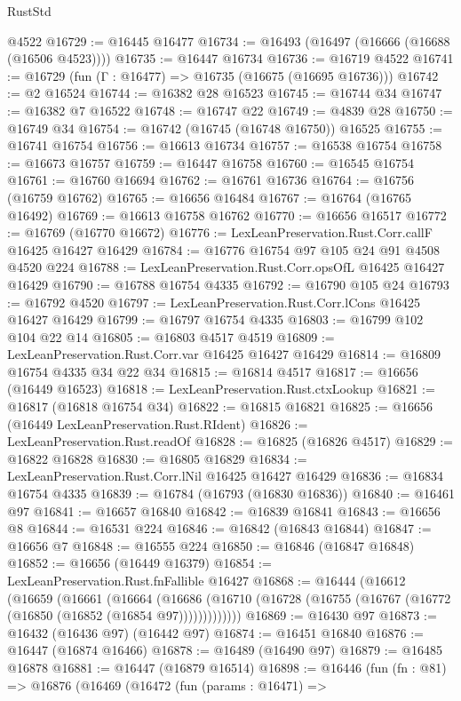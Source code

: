 \begin{lexlean}{RustStd}
\begin{coremodule}
    @4522
@16729 := @16445 @16477
@16734 := @16493 (@16497 (@16666 (@16688 (@16506 @4523))))
@16735 := @16447 @16734
@16736 := @16719 @4522
@16741 := @16729 (fun (Γ : @16477) => @16735 (@16675 (@16695 @16736)))
@16742 := @2 @16524
@16744 := @16382 @28 @16523
@16745 := @16744 @34
@16747 := @16382 @7 @16522
@16748 := @16747 @22
@16749 := @4839 @28
@16750 := @16749 @34
@16754 := @16742 (@16745 (@16748 @16750)) @16525
@16755 := @16741 @16754
@16756 := @16613 @16734
@16757 := @16538 @16754
@16758 := @16673 @16757
@16759 := @16447 @16758
@16760 := @16545 @16754
@16761 := @16760 @16694
@16762 := @16761 @16736
@16764 := @16756 (@16759 @16762)
@16765 := @16656 @16484
@16767 := @16764 (@16765 @16492)
@16769 := @16613 @16758 @16762
@16770 := @16656 @16517
@16772 := @16769 (@16770 @16672)
@16776 := LexLeanPreservation.Rust.Corr.callF @16425 @16427 @16429
@16784 := @16776 @16754 @97 @105 @24 @91 @4508 @4520 @224
@16788 := LexLeanPreservation.Rust.Corr.opsOfL @16425 @16427 @16429
@16790 := @16788 @16754 @4335
@16792 := @16790 @105 @24
@16793 := @16792 @4520
@16797 := LexLeanPreservation.Rust.Corr.lCons @16425 @16427 @16429
@16799 := @16797 @16754 @4335
@16803 := @16799 @102 @104 @22 @14
@16805 := @16803 @4517 @4519
@16809 := LexLeanPreservation.Rust.Corr.var @16425 @16427 @16429
@16814 := @16809 @16754 @4335 @34 @22 @34
@16815 := @16814 @4517
@16817 := @16656 (@16449 @16523)
@16818 := LexLeanPreservation.Rust.ctxLookup
@16821 := @16817 (@16818 @16754 @34)
@16822 := @16815 @16821
@16825 := @16656 (@16449 LexLeanPreservation.Rust.RIdent)
@16826 := LexLeanPreservation.Rust.readOf
@16828 := @16825 (@16826 @4517)
@16829 := @16822 @16828
@16830 := @16805 @16829
@16834 := LexLeanPreservation.Rust.Corr.lNil @16425 @16427 @16429
@16836 := @16834 @16754 @4335
@16839 := @16784 (@16793 (@16830 @16836))
@16840 := @16461 @97
@16841 := @16657 @16840
@16842 := @16839 @16841
@16843 := @16656 @8
@16844 := @16531 @224
@16846 := @16842 (@16843 @16844)
@16847 := @16656 @7
@16848 := @16555 @224
@16850 := @16846 (@16847 @16848)
@16852 := @16656 (@16449 @16379)
@16854 := LexLeanPreservation.Rust.fnFallible @16427
@16868 := @16444
    (@16612
      (@16659
        (@16661
          (@16664
            (@16686 (@16710 (@16728 (@16755 (@16767 (@16772 (@16850 (@16852 (@16854 @97)))))))))))))
@16869 := @16430 @97
@16873 := @16432 (@16436 @97) (@16442 @97)
@16874 := @16451 @16840
@16876 := @16447 (@16874 @16466)
@16878 := @16489 (@16490 @97)
@16879 := @16485 @16878
@16881 := @16447 (@16879 @16514)
@16898 := @16446
    (fun (fn : @81) =>
    @16876
      (@16469
        (@16472
          (fun (params : @16471) =>

\end{coremodule}
\end{lexlean}
